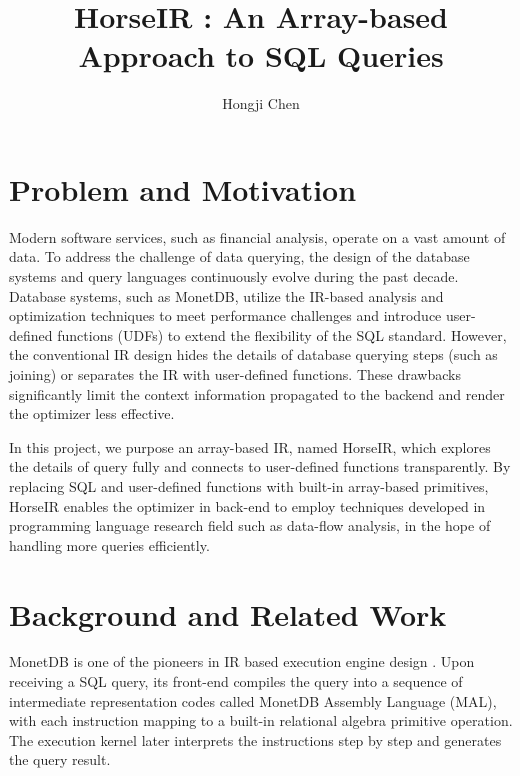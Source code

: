\documentclass[sigplan]{acmart}
\begin{document}
\title{HorseIR : An Array-based Approach to SQL Queries}

\author{Hongji Chen}

\maketitle

\section{Problem and Motivation}

Modern software services, such as financial analysis, operate on a vast amount
of data. To address the challenge of data querying, the design of the database
systems and query languages continuously evolve during the past decade.
Database systems, such as MonetDB\cite{MonetDBHome}, utilize the
IR-based analysis and optimization techniques to meet performance
challenges and introduce user-defined functions (UDFs) to extend the
flexibility of the SQL standard.  However, the conventional IR design hides the
details of database querying steps (such as joining) or separates the IR with
user-defined functions. These drawbacks significantly limit the context
information propagated to the backend and render the optimizer less effective. 

In this project, we purpose an array-based IR, named HorseIR, which explores the
details of query fully and connects to user-defined functions transparently. By
replacing SQL and user-defined functions with built-in array-based primitives,
HorseIR enables the optimizer in back-end to employ techniques developed in
programming language research field such as data-flow analysis, in the hope of
handling more queries efficiently. 

\section{Background and Related Work}

MonetDB is one of the pioneers in IR based execution engine design
\cite{DBLP:journals/debu/IdreosGNMMK12}. Upon receiving a SQL query, its
front-end compiles the query into a sequence of intermediate representation
codes called MonetDB Assembly Language (MAL), with each instruction mapping to
a built-in relational algebra primitive operation. The execution kernel later
interprets the instructions step by step and generates the query result.
\end{document}
